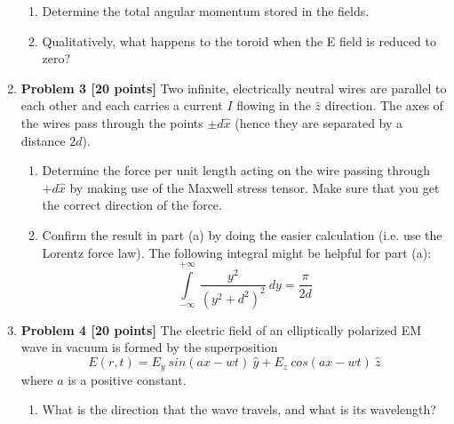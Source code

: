 \documentclass[fleqn]{article}
\begin{document}
\begin{enumerate}
\begin{enumerate}
        \item Determine the total angular momentum stored in the fields.


        \item Qualitatively, what happens to the toroid when the E field is reduced to zero?


      \end{enumerate}

    \item \textbf{Problem 3 [20 points]} 
    Two infinite, electrically neutral wires are parallel to each other and each carries a current $I$ flowing
    in the $\hat{z}$ direction. The axes of the wires pass through the points $\pm d\hat{x}$ (hence they are separated by
    a distance $2d$).
    \begin{enumerate}
      \item Determine the force per unit length acting on the wire passing through $+d\hat{x}$ by making use of
      the Maxwell stress tensor. Make sure that you get the correct direction of the force.



      \item Confirm the result in part (a) by doing the easier calculation (i.e. use the Lorentz force law).
      The following integral might be helpful for part (a):
      $$
        \int\limits_{-\infty}^{+\infty} ~ \dfrac{y^2}{\left(y^2+d^2\right)^2} ~ dy=\dfrac{\pi}{2d} 
      $$


    \end{enumerate}

    \item \textbf{Problem 4 [20 points]} The electric field of an elliptically polarized EM wave in vacuum is formed by the superposition
      $$
        E(r,t)=E_y ~ sin(ax-wt) ~ \hat{y}+E_z ~ cos(ax-wt) ~ \hat{z}
      $$
      where $a$ is a positive constant.
      \begin{enumerate}
        \item What is the direction that the wave travels, and what is its wavelength?


\end{enumerate}
\end{enumerate}
\end{document}
